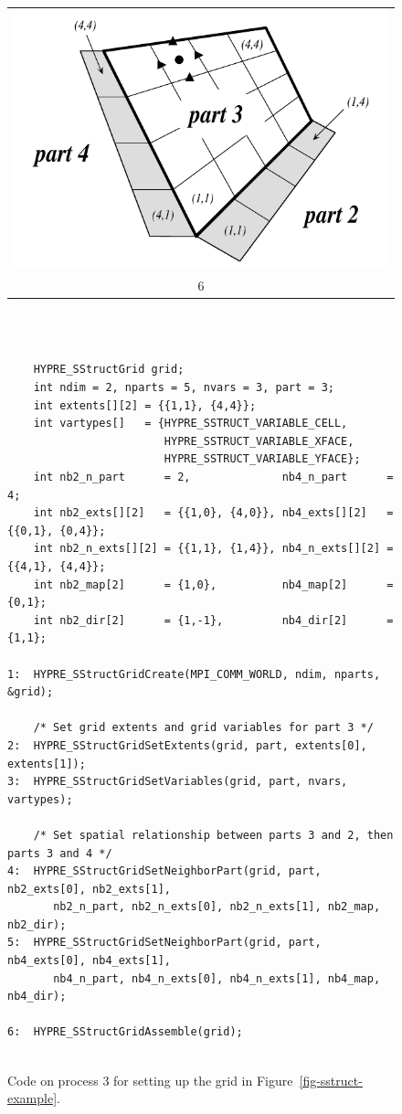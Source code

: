 \begin{figure}
\begin{tabular}{@{}c@{}}
\end{tabular}
\hfill
\begin{tabular}{@{}c@{}}
\includegraphics[width=.28\textwidth]{figSStructGrid6} \\ 6
\end{tabular}
\vspace{2em} \\
\begin{minipage}{0.9\textwidth}
\begin{verbatim}
    
    HYPRE_SStructGrid grid;
    int ndim = 2, nparts = 5, nvars = 3, part = 3;
    int extents[][2] = {{1,1}, {4,4}};
    int vartypes[]   = {HYPRE_SSTRUCT_VARIABLE_CELL,
                        HYPRE_SSTRUCT_VARIABLE_XFACE,
                        HYPRE_SSTRUCT_VARIABLE_YFACE};
    int nb2_n_part      = 2,              nb4_n_part      = 4;
    int nb2_exts[][2]   = {{1,0}, {4,0}}, nb4_exts[][2]   = {{0,1}, {0,4}};
    int nb2_n_exts[][2] = {{1,1}, {1,4}}, nb4_n_exts[][2] = {{4,1}, {4,4}};
    int nb2_map[2]      = {1,0},          nb4_map[2]      = {0,1};
    int nb2_dir[2]      = {1,-1},         nb4_dir[2]      = {1,1};

1:  HYPRE_SStructGridCreate(MPI_COMM_WORLD, ndim, nparts, &grid);
    
    /* Set grid extents and grid variables for part 3 */
2:  HYPRE_SStructGridSetExtents(grid, part, extents[0], extents[1]);
3:  HYPRE_SStructGridSetVariables(grid, part, nvars, vartypes);
    
    /* Set spatial relationship between parts 3 and 2, then parts 3 and 4 */
4:  HYPRE_SStructGridSetNeighborPart(grid, part, nb2_exts[0], nb2_exts[1],
       nb2_n_part, nb2_n_exts[0], nb2_n_exts[1], nb2_map, nb2_dir);
5:  HYPRE_SStructGridSetNeighborPart(grid, part, nb4_exts[0], nb4_exts[1],
       nb4_n_part, nb4_n_exts[0], nb4_n_exts[1], nb4_map, nb4_dir);
    
6:  HYPRE_SStructGridAssemble(grid);
    
\end{verbatim}
\end{minipage}
\caption{%
Code on process 3 for setting up the grid in Figure~\ref{fig-sstruct-example}.}
\label{fig-sstruct-grid}
\end{figure}


